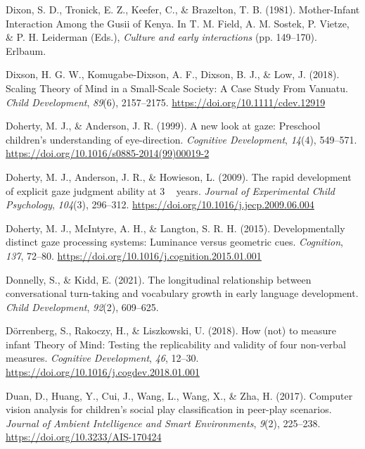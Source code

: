 \documentclass[
]{scrbook}
\newlength{\cslhangindent}
\newenvironment{CSLReferences}[2] %
 {\begin{list}{}{%
  \setlength{\itemindent}{0pt}
  \setlength{\leftmargin}{0pt}
  \setlength{\parsep}{0pt}
  \ifodd #1
   \setlength{\leftmargin}{\cslhangindent}
   \setlength{\itemindent}{-1\cslhangindent}
  \fi
  \setlength{\itemsep}{#2\baselineskip}}}
 {\end{list}}
\begin{document}
\begin{CSLReferences}{1}{0}
Dixon, S. D., Tronick, E. Z., Keefer, C., \& Brazelton, T. B. (1981). Mother-{Infant Interaction Among} the {Gusii} of {Kenya}. In T. M. Field, A. M. Sostek, P. Vietze, \& P. H. Leiderman (Eds.), \emph{Culture and early interactions} (pp. 149--170). Erlbaum.

Dixson, H. G. W., Komugabe-Dixson, A. F., Dixson, B. J., \& Low, J. (2018). Scaling {Theory} of {Mind} in a {Small-Scale Society}: {A Case Study From Vanuatu}. \emph{Child Development}, \emph{89}(6), 2157--2175. \url{https://doi.org/10.1111/cdev.12919}

Doherty, M. J., \& Anderson, J. R. (1999). A new look at gaze: {Preschool} children's understanding of eye-direction. \emph{Cognitive Development}, \emph{14}(4), 549--571. \url{https://doi.org/10.1016/s0885-2014(99)00019-2}

Doherty, M. J., Anderson, J. R., \& Howieson, L. (2009). The rapid development of explicit gaze judgment ability at 3 ~ years. \emph{Journal of Experimental Child Psychology}, \emph{104}(3), 296--312. \url{https://doi.org/10.1016/j.jecp.2009.06.004}

Doherty, M. J., McIntyre, A. H., \& Langton, S. R. H. (2015). Developmentally distinct gaze processing systems: {Luminance} versus geometric cues. \emph{Cognition}, \emph{137}, 72--80. \url{https://doi.org/10.1016/j.cognition.2015.01.001}

Donnelly, S., \& Kidd, E. (2021). The longitudinal relationship between conversational turn-taking and vocabulary growth in early language development. \emph{Child Development}, \emph{92}(2), 609--625.

Dörrenberg, S., Rakoczy, H., \& Liszkowski, U. (2018). How (not) to measure infant {Theory} of {Mind}: {Testing} the replicability and validity of four non-verbal measures. \emph{Cognitive Development}, \emph{46}, 12--30. \url{https://doi.org/10.1016/j.cogdev.2018.01.001}

Duan, D., Huang, Y., Cui, J., Wang, L., Wang, X., \& Zha, H. (2017). Computer vision analysis for children's social play classification in peer-play scenarios. \emph{Journal of Ambient Intelligence and Smart Environments}, \emph{9}(2), 225--238. \url{https://doi.org/10.3233/AIS-170424}


\end{CSLReferences}
\end{document}
